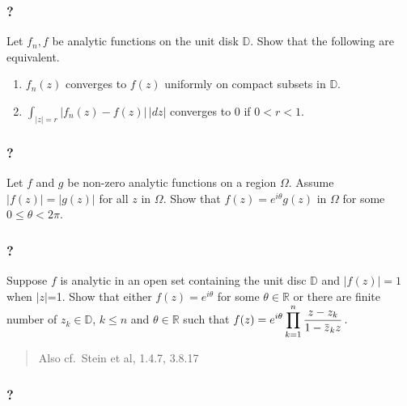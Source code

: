 \hypertarget{section-158}{%
\subsubsection{?}\label{section-158}}

Let \(f_n, f\) be analytic functions on the unit disk \({\mathbb D}\).
Show that the following are equivalent.

\begin{enumerate}
\def\labelenumi{(\roman{enumi})}
\item
  \(f_n(z)\) converges to \(f(z)\) uniformly on compact subsets in
  \(\mathbb D\).
\item
  \(\int_{|z|= r} |f_n(z) - f(z)| \, |dz|\) converges to \(0\) if
  \(0< r<1\).
\end{enumerate}

\hypertarget{section-159}{%
\subsubsection{?}\label{section-159}}

Let \(f\) and \(g\) be non-zero analytic functions on a region
\(\Omega\). Assume \(|f(z)| = |g(z)|\) for all \(z\) in \(\Omega\). Show
that \(f(z) = e^{i \theta} g(z)\) in \(\Omega\) for some
\(0 \leq \theta < 2 \pi\).

\hypertarget{section-160}{%
\subsubsection{?}\label{section-160}}

Suppose \(f\) is analytic in an open set containing the unit disc
\(\mathbb D\) and \(|f(z)| =1\) when \(|z|\)=1. Show that either
\(f(z) = e^{i \theta}\) for some \(\theta \in \mathbb R\) or there are
finite number of \(z_k \in \mathbb D\), \(k \leq n\) and
\(\theta \in \mathbb R\) such that
\(\displaystyle f(z) = e^{i\theta} \prod_{k=1}^n \frac{z-z_k}{1 - \mkern 1.5mu\overline{\mkern-1.5muz\mkern-1.5mu}\mkern 1.5mu_k z } \, .\)

\begin{quote}
Also cf.~Stein et al, 1.4.7, 3.8.17
\end{quote}

\hypertarget{section-161}{%
\subsubsection{?}\label{section-161}}


